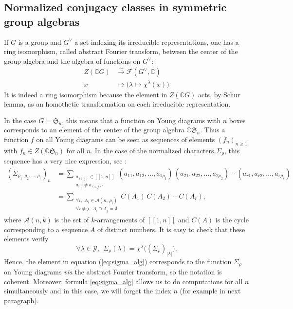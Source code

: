 \documentclass[10pt]{amsart}
\theoremstyle{remark}
\newcommand{\C}{\mathbb{C}}
\newcommand{\Func}{\mathcal{F}}
\newcommand{\Arr}{\mathcal{A}}
\newcommand{\sym}{\mathfrak{S}}
\newcommand{\young}{\mathscr{Y}}
\newcommand{\lle}{\left[\!\left[}
\newcommand{\rre}{\right]\!\right]}
\begin{document}
\subsection{Normalized conjugacy classes in symmetric group algebras}
If $G$ is a group and $G^\vee$ a set indexing its irreducible representations,
one has a ring isomorphism, called abstract Fourier transform, between the center
of the group algebra and the algebra of functions on $G^\vee$:
\begin{align*}
    Z(\C G) &\stackrel{\sim}{\rightarrow} \Func(G^\vee,\C) \\
    x &\mapsto \big( \lambda \mapsto \chi^\lambda(x) \big)
\end{align*}
It is indeed a ring isomorphism because the element in $Z(\C G)$
acts, by Schur lemma, as an homothetic transformation on each
irreducible representation.\bigskip

In the case $G=\sym_n$, this means that a function on Young diagrams with $n$
boxes corresponds to an element of the center of the group algebra $\C\sym_n$.
Thus a function $f$ on all Young diagrams can be seen as sequences
of elements $(f_n)_{n \geq 1}$ with $f_n \in Z(\C\sym_n)$ for all $n$.
In the case of the normalized characters $\varSigma_\rho$,
this sequence has a very nice expression, see \cite{Sniady06}:
\begin{align}
\left(\varSigma_{\rho_1,\rho_2,\ldots,\rho_r}\right)_n & = \sum_{\substack{a_{(i,j)} \in \lle 1,n \rre \\ a_{i,j}\neq a_{(i,j)'}}} (a_{11},a_{12},\ldots,a_{1\rho_1})\,(a_{21},a_{22},\ldots,a_{2\rho_2})\,\cdots\,(a_{r1},a_{r2},\ldots,a_{r\rho_r}) \nonumber\\
\label{eq:sigma_alg} &= \sum_{\substack{\forall i,\,\,A_i \in \Arr(n,\,\rho_i)\\ \forall i\neq j,\,\,A_i\cap A_j=\emptyset}} C(A_1)\,C(A_2)\,\cdots \,C(A_r),
\end{align}
where $\Arr(n,k)$ is the set of $k$-arrangements of $\lle 1,n \rre$
and $C(A)$ is the cycle corresponding to a sequence $A$ of distinct numbers.
It is easy to check that these elements verify
$$\forall \lambda \in \young, \ \ \varSigma_\rho(\lambda)
=\chi^\lambda\big((\varSigma_\rho)_{|\lambda|}\big).$$
Hence, the element in equation (\ref{eq:sigma_alg}) corresponds to the
function $\varSigma_\rho$ on Young diagrams {\it via} the abstract Fourier transform,
so the notation is coherent. Moreover, formula \eqref{eq:sigma_alg}
allows us to do computations for all $n$ simultaneously and in this case,
we will forget the index $n$ (for example in next paragraph).\bigskip
\end{document}
